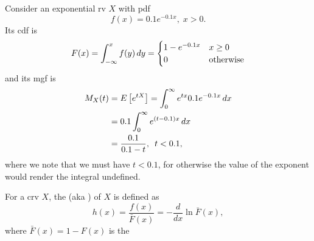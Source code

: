 \documentclass[notoc,notitlepage]{tufte-book}
\begin{document}
\begin{eg}
  Consider an exponential rv $X$ with pdf
  \begin{equation*}
    f(x) = 0.1e^{-0.1x}, \; x > 0.
  \end{equation*}
  Its cdf is
  \begin{equation*}
    F(x) = \int_{-\infty}^{x} f(y) \mathop{}\!d{y} = \begin{cases}
      1 - e^{-0.1 x} & x \geq 0 \\
      0              & \text{otherwise}
    \end{cases}
  \end{equation*}
  and its mgf is
  \begin{align*}
    M_X(t) &= E\left[ e^{tX} \right] = \int_{0}^{\infty} e^{tx} 0.1 e^{-0.1x} \mathop{}\!d{x} \\
           &= 0.1 \int_{0}^{\infty} e^{( t - 0.1 )x} \mathop{}\!d{x} \\
           &= \frac{0.1}{0.1 - t}, \enspace t < 0.1,
  \end{align*}
  where we note that we must have $t < 0.1$, for otherwise the value of the exponent would render the integral undefined.
\end{eg}

\begin{defn}
\label{defn:hazard_rate_function}
  For a crv $X$, the  (aka ) of $X$ is defined as
  \begin{equation*}
    h(x) = \frac{f(x)}{\bar{F}(x)} = - \frac{d}{dx} \ln \bar{F}(x),
  \end{equation*}
  where $\bar{F}(x) = 1 - F(x)$ is the 
\end{defn}
\end{document}
